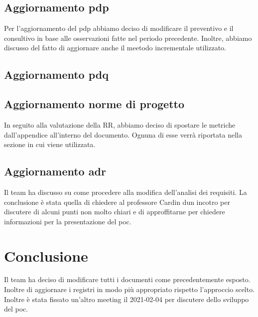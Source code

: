 \subsection{Aggiornamento pdp}
Per l'aggiornamento del pdp abbiamo deciso di modificare il preventivo e il consultivo in base alle osservazioni fatte nel periodo precedente. 
Inoltre, abbiamo discusso del fatto di aggiornare anche il meetodo incrementale utilizzato. 

\subsection{Aggiornamento pdq}


\subsection{Aggiornamento norme di progetto}
In seguito alla valutazione della RR, abbiamo deciso di spostare le metriche dall'appendice all'interno del documento.
Ognuna di esse verrà riportata nella sezione in cui viene utilizzata.

\subsection{Aggiornamento adr}
Il team ha discusso su come procedere alla modifica dell'analisi dei requisiti. La conclusione è stata quella di chiedere al professore Cardin dun incotro per discutere di alcuni punti non molto chiari e di approffitarne per chiedere informazioni per la presentazione del poc.

\section{Conclusione}
Il team ha deciso di modificare tutti i documenti come precedentemente esposto. Inoltre di aggiornare i registri in modo più appropriato rispetto l'approccio scelto.
Inoltre è stata fissato un'altro meeting il 2021-02-04 per discutere dello sviluppo del poc.

